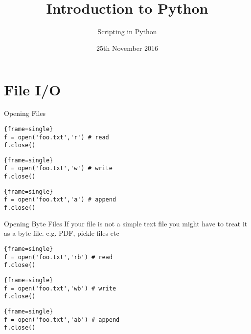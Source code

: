 \documentclass{beamer}
\title{Introduction to Python}
\subtitle{Scripting in Python}
\date{25th November 2016}
\begin{document}
\lstset{language=Python}

\begin{frame}
  \titlepage
\end{frame}




\section{File I/O}

\begin{frame}[fragile]{Opening Files}
\begin{block}{}
\begin{lstlisting}{frame=single}
f = open('foo.txt','r') # read
f.close()
\end{lstlisting}
\end{block}
\pause
 \begin{block}{}
\begin{lstlisting}{frame=single}
f = open('foo.txt','w') # write
f.close()
\end{lstlisting}
\end{block}
\pause
 \begin{block}{}
\begin{lstlisting}{frame=single}
f = open('foo.txt','a') # append
f.close()
\end{lstlisting}
\end{block}
\end{frame}
\begin{frame}[fragile]{Opening Byte Files}
If your file is not a simple text file you might have to treat it as a byte file. e.g. PDF, pickle files etc
\begin{block}{}
\begin{lstlisting}{frame=single}
f = open('foo.txt','rb') # read
f.close()
\end{lstlisting}
\end{block}
 \begin{block}{}
\begin{lstlisting}{frame=single}
f = open('foo.txt','wb') # write
f.close()
\end{lstlisting}
\end{block}
 \begin{block}{}
\begin{lstlisting}{frame=single}
f = open('foo.txt','ab') # append
f.close()
\end{lstlisting}
\end{block}
\end{frame}
\end{document}
